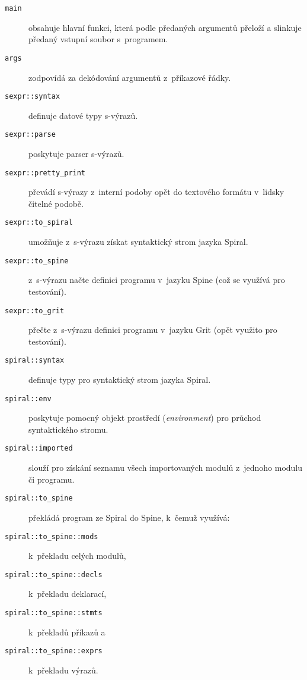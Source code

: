 \begin{description}
  \item[\texttt{main}] obsahuje hlavní funkci, která podle předaných argumentů
    přeloží a slinkuje předaný vstupní soubor s~programem.
  \item[\texttt{args}] zodpovídá za dekódování argumentů z~příkazové řádky.

  \item[\texttt{sexpr::syntax}] definuje datové typy s-výrazů.
  \item[\texttt{sexpr::parse}] poskytuje parser s-výrazů.
  \item[\texttt{sexpr::pretty_print}] převádí s-výrazy z~interní podoby opět do
    textového formátu v~lidsky čitelné podobě.
  \item[\texttt{sexpr::to_spiral}] umožňuje z~s-výrazu získat syntaktický strom
    jazyka Spiral.
  \item[\texttt{sexpr::to_spine}] z~s-výrazu načte definici programu v~jazyku
    Spine (což se využívá pro testování).
  \item[\texttt{sexpr::to_grit}] přečte z~s-výrazu definici programu v~jazyku
    Grit (opět využito pro testování).

  \item[\texttt{spiral::syntax}] definuje typy pro syntaktický strom jazyka
    Spiral.
  \item[\texttt{spiral::env}] poskytuje pomocný objekt prostředí
    (\emph{environment}) pro průchod syntaktického stromu.
  \item[\texttt{spiral::imported}] slouží pro získání seznamu všech
    importovaných modulů z~jednoho modulu či programu.
  \item[\texttt{spiral::to_spine}] překládá program ze Spiral do Spine, k~čemuž
    využívá:
  \item[\texttt{spiral::to_spine::mods}] k~překladu celých modulů,
  \item[\texttt{spiral::to_spine::decls}] k~překladu deklarací,
  \item[\texttt{spiral::to_spine::stmts}] k~překladů příkazů a
  \item[\texttt{spiral::to_spine::exprs}] k~překladu výrazů.


\end{description}
